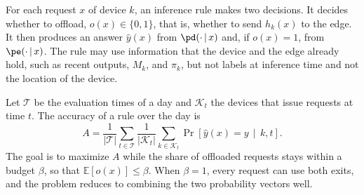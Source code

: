 For each request $x$ of device $k$, an inference rule makes two decisions. It decides whether to offload, $o(x)\in\{0,1\}$, that is, whether to send $h_k(x)$ to the edge. It then produces an answer $\hat y(x)$ from $\pd(\cdot\,|\,x)$ and, if $o(x)=1$, from $\pe(\cdot\,|\,x)$. The rule may use information that the device and the edge already hold, such as recent outputs, $M_k$, and $\pi_k$, but not labels at inference time and not the location of the device.

Let $\mathcal{T}$ be the evaluation times of a day and $\mathcal{K}_t$ the devices that issue requests at time $t$. The accuracy of a rule over the day is
\begin{equation}
A=\frac{1}{|\mathcal{T}|}\sum_{t\in\mathcal{T}}\frac{1}{|\mathcal{K}_t|}\sum_{k\in\mathcal{K}_t}\Pr\!\left[\hat y(x)=y\,\middle|\,k,t\right].
\label{eq:accuracy}
\end{equation}
The goal is to maximize $A$ while the share of offloaded requests stays within a budget $\beta$, so that $\mathbb{E}[o(x)]\le\beta$. When $\beta=1$, every request can use both exits, and the problem reduces to combining the two probability vectors well.
